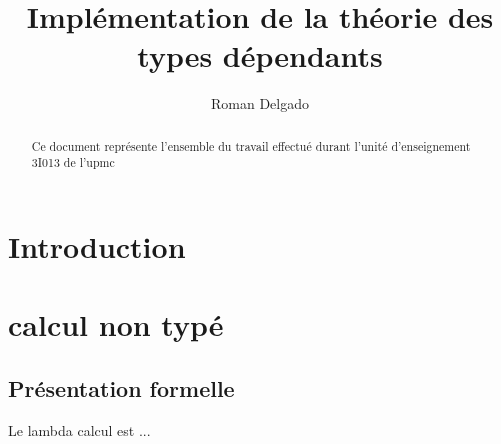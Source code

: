 \documentclass {article}
\title{Implémentation de la théorie des types dépendants}
\date{}
\author{Roman Delgado}
\begin{document}
\maketitle

\begin{abstract} 
Ce document représente l'ensemble du travail effectué durant l'unité d'enseignement 3I013 de l'upmc
\end{abstract}

\tableofcontents

\clearpage


\section{Introduction}

\section{\lambda calcul non typé}

\subsection{Présentation formelle}

Le lambda calcul est ...
\end{document}
